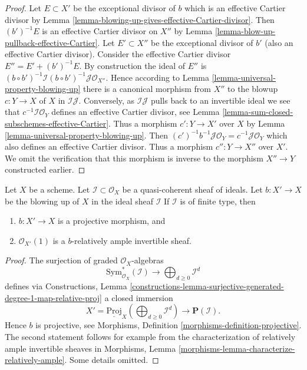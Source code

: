 \begin{proof}
Let $E \subset X'$ be the exceptional divisor of $b$ which is an effective
Cartier divisor by
Lemma \ref{lemma-blowing-up-gives-effective-Cartier-divisor}.
Then $(b')^{-1}E$ is an effective Cartier divisor on $X''$ by
Lemma \ref{lemma-blow-up-pullback-effective-Cartier}.
Let $E' \subset X''$ be the exceptional divisor of $b'$ (also an effective
Cartier divisor). Consider the effective Cartier divisor
$E'' = E' + (b')^{-1}E$. By construction the ideal of $E''$ is
$(b \circ b')^{-1}\mathcal{I} (b \circ b')^{-1}\mathcal{J} \mathcal{O}_{X''}$.
Hence according to Lemma \ref{lemma-universal-property-blowing-up}
there is a canonical morphism from $X''$ to the blowup $c : Y \to X$
of $X$ in $\mathcal{I}\mathcal{J}$. Conversely, as $\mathcal{I}\mathcal{J}$
pulls back to an invertible ideal we see that
$c^{-1}\mathcal{I}\mathcal{O}_Y$ defines
an effective Cartier divisor, see
Lemma \ref{lemma-sum-closed-subschemes-effective-Cartier}.
Thus a morphism $c' : Y \to X'$ over $X$ by
Lemma \ref{lemma-universal-property-blowing-up}.
Then $(c')^{-1}b^{-1}\mathcal{J}\mathcal{O}_Y = c^{-1}\mathcal{J}\mathcal{O}_Y$
which also defines an effective Cartier divisor. Thus a morphism
$c'' : Y \to X''$ over $X'$. We omit the verification that this
morphism is inverse to the morphism $X'' \to Y$ constructed earlier.
\end{proof}

\begin{lemma}
\label{lemma-blowing-up-projective}
Let $X$ be a scheme. Let $\mathcal{I} \subset \mathcal{O}_X$ be a
quasi-coherent sheaf of ideals. Let $b : X' \to X$ be the blowing up of $X$
in the ideal sheaf $\mathcal{I}$ If $\mathcal{I}$ is of finite type, then
\begin{enumerate}
\item $b : X' \to X$ is a projective morphism, and
\item $\mathcal{O}_{X'}(1)$ is a $b$-relatively ample invertible sheaf.
\end{enumerate}
\end{lemma}

\begin{proof}
The surjection of graded $\mathcal{O}_X$-algebras
$$
\text{Sym}_{\mathcal{O}_X}^*(\mathcal{I})
\longrightarrow
\bigoplus\nolimits_{d \geq 0} \mathcal{I}^d
$$
defines via Constructions, Lemma
\ref{constructions-lemma-surjective-generated-degree-1-map-relative-proj}
a closed immersion
$$
X' = \underline{\text{Proj}}_X (\bigoplus\nolimits_{d \geq 0} \mathcal{I}^d)
\longrightarrow
\mathbf{P}(\mathcal{I}).
$$
Hence $b$ is projective, see
Morphisms, Definition \ref{morphisms-definition-projective}.
The second statement follows for example from the characterization
of relatively ample invertible sheaves in
Morphisms, Lemma \ref{morphisms-lemma-characterize-relatively-ample}.
Some details omitted.
\end{proof}

